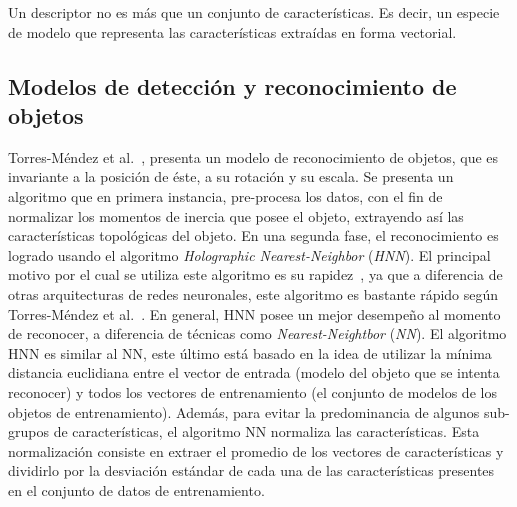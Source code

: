 \begin{definition}[Descriptor]\label{def:desc}
Un descriptor no es más que un conjunto de características. Es decir, un especie de modelo que representa las características extraídas en forma vectorial.
\end{definition}


\subsection{Modelos de detección y reconocimiento de objetos}
Torres-Méndez et al.~\cite{trsi2000}, presenta un modelo de reconocimiento de objetos, que es invariante a la posición de éste, a su rotación y su escala. Se presenta un algoritmo que en primera instancia, pre-procesa los datos, con el fin de normalizar los momentos de inercia que posee el objeto, extrayendo así las características topológicas del objeto. En una segunda fase, el reconocimiento es logrado usando el algoritmo \textit{Holographic Nearest-Neighbor} (\textit{HNN}). El principal motivo por el cual se utiliza este algoritmo es su rapidez~\cite{trsi2000}, ya que a diferencia de otras arquitecturas de redes neuronales, este algoritmo es bastante rápido según Torres-Méndez et al.~\cite{trsi2000}. En general, HNN posee un mejor desempeño al momento de reconocer, a diferencia de técnicas como \textit{Nearest-Neightbor} (\textit{NN}). El algoritmo HNN es similar al NN, este último está basado en la idea de utilizar la mínima distancia euclidiana entre el vector de entrada (modelo del objeto que se intenta reconocer) y todos los vectores de entrenamiento (el conjunto de modelos de los objetos de entrenamiento). Además, para evitar la predominancia de algunos sub-grupos de características, el algoritmo NN normaliza las características. Esta normalización consiste en extraer el promedio de los vectores de características y dividirlo por la desviación estándar de cada una de las características presentes en el conjunto de datos de entrenamiento.

